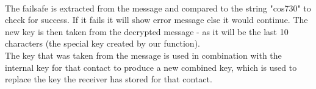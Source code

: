 \vspace{10pt}\\
The failsafe is extracted from the message and compared to the string "cos730" to check for success. If it fails it will show error message else it would continue. The new key is then taken from the decrypted message - as it will be the last 10 characters (the special key created by our function). 
\vspace{10pt}\\
The key that was taken from the message is used in combination with the internal key for that contact to produce a new combined key, which is used to replace the key the receiver has stored for that contact.